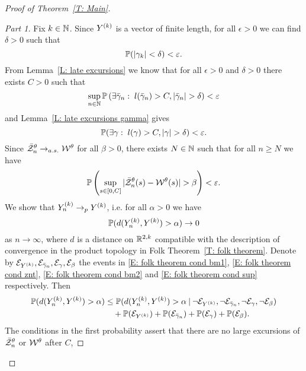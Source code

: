 \begin{proof}[Proof of Theorem~\ref{T: Main}]
\begin{proof}[Part 1]
	Fix $k \in \mathbb{N}$. 
	Since $Y^{(k)}$ is a vector of finite length, for all $\epsilon > 0$ we can find $\delta > 0$ such that
	\begin{equation} \label{E: folk theorem cond bm1}
		\mathbb{P}(|\gamma_k| < \delta) < \varepsilon.
	\end{equation}
	From Lemma~\ref{L: late excursions} we know
	that for all $\epsilon> 0$ and $\delta > 0$ there exists $C > 0$ such that
	\begin{equation} \label{E: folk theorem cond znt}
		\sup_{n \in \mathbb{N}} \mathbb{P}\left( \exists \bar{\gamma}_n: \; l(\bar{\gamma}_n) > C, |\bar{\gamma}_n| > \delta \right) < \varepsilon
	\end{equation}
	and Lemma~\ref{L: late excursions gamma} gives
	\begin{equation} \label{E: folk theorem cond bm2}
		\mathbb{P}(\exists \gamma: \; l(\gamma) > C, |\gamma| > \delta) < \varepsilon.
	\end{equation}
	Since $\bar{\mathcal{Z}}^{\theta}_n \rightarrow_{a.s.} \mathcal{W}^{\theta}$ for all $\beta > 0$, there exists $N \in \mathbb{N}$ such that for all $n \geq N$ we have
	\begin{equation} \label{E: folk theorem cond sup}
		\mathbb{P}\left( \sup_{s \in [0, C]} |\bar{\mathcal{Z}}^{\theta}_n(s) - \mathcal{W}^{\theta}(s)| > \beta \right) < \varepsilon.
	\end{equation}
	We show that $Y_n^{(k)} \rightarrow_p Y^{(k)}$, i.e. for all $\alpha > 0$ we have
	\begin{equation*}
		\mathbb{P}( d(Y_n^{(k)}, Y^{(k)}) > \alpha) \rightarrow 0
	\end{equation*}
	as $n \rightarrow \infty$, 
	where $d$ is a distance on $\mathbb{R}^{2, k}$ compatible with the description of convergence in the product topology in Folk Theorem~\ref{T: folk theorem}.
	Denote by $\mathcal{E}_{Y^{(k)}}, \mathcal{E}_{\bar{\gamma}_n}, \mathcal{E}_{\gamma}, \mathcal{E}_{\beta}$ the events in 
	\eqref{E: folk theorem cond bm1}, \eqref{E: folk theorem cond znt}, \eqref{E: folk theorem cond bm2} and \eqref{E: folk theorem cond sup} respectively.
	Then
	\begin{equation*}
		\begin{aligned}
		\mathbb{P}( d(Y_n^{(k)}, Y^{(k)}) > \alpha) 
		&\leq \mathbb{P}( d(Y_n^{(k)}, Y^{(k)}) > \alpha \: | \: \neg\mathcal{E}_{Y^{(k)}}, \neg\mathcal{E}_{\bar{\gamma}_n}, \neg\mathcal{E}_{\gamma}, \neg\mathcal{E}_{\beta}) \\
		&\quad + \mathbb{P}(\mathcal{E}_{Y^{(k)}}) + \mathbb{P}(\mathcal{E}_{\bar{\gamma}_n}) + \mathbb{P}(\mathcal{E}_{\gamma}) + \mathbb{P}(\mathcal{E}_{\beta}). 
		\end{aligned}
	\end{equation*}
	The conditions in the first probability assert that there are no large excursions of $\bar{\mathcal{Z}}^{\theta}_n$ or $\mathcal{W}^{\theta}$ after $C$,

\end{proof}
\end{proof}
